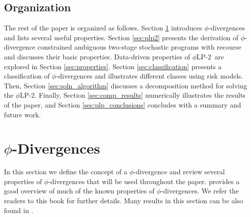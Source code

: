 \documentclass[opre,nonblindrev]{informs3} %
\newcommand{\plp}{$\phi$LP-2}
\begin{document}
\subsection{Organization}

The rest of the paper is organized as follows.
Section \ref{sec:phi_divergences} introduces $\phi$-divergences and lists several useful properties.
Section \ref{sec:plp2} presents the derivation of $\phi$-divergence constrained ambiguous two-stage stochastic programs with recourse and discusses their basic properties. %
Data-driven properties of \plp\ are explored in Section \ref{sec:properties}. 
Section \ref{sec:classification} presents a classification of $\phi$-divergences and illustrates different classes using risk models. 
Then, Section \ref{sec:soln_algorithm} discusses a decomposition method for solving the \plp. Finally, Section \ref{sec:comp_results} numerically illustrates the results of the paper, and 
Section \ref{sec:plp_conclusions} concludes with a summary and future work.

\section{$\phi$-Divergences} %
\label{sec:phi_divergences}

In this section we define the concept of a $\phi$-divergence and review several properties of  $\phi$-divergences that will be used throughout the paper. 
\citet{pardo2005statistical} provides a good overview of much of the known properties of $\phi$-divergences. 
We refer the readers to this book for further details.
Many results in this section can be also found in \cite{bental1991certainty,bental2013robust}.
\end{document}
